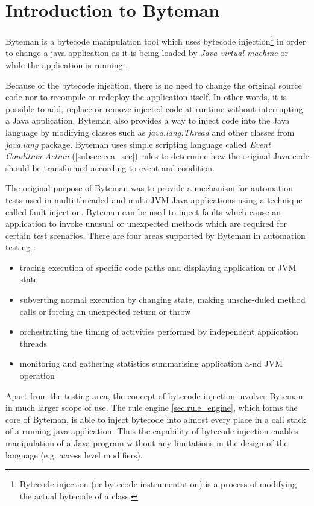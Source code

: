 \documentclass[12pt,oneside]{fithesis2}
\begin{document}
\section{Introduction to Byteman}
Byteman is a bytecode manipulation tool which uses bytecode injection\footnote{Bytecode injection (or bytecode instrumentation) is a process of modifying the actual bytecode of a class.} in order to change a java application as it is being loaded by \textit{Java virtual machine} or while the application is running \cite[Introduction to Byteman]{byteman_doc}.

Because of the bytecode injection, there is no need to change the original source code nor to recompile or redeploy the application itself. In other words, it is possible to add, replace or remove injected code at runtime without interrupting a Java application. Byteman also provides a way to inject code into the Java language by modifying classes such as \textit{java.lang.Thread} and other classes from \textit{java.lang} package. Byteman uses simple scripting language called \textit{Event Condition Action} (\ref{subsec:eca_sec}) rules to determine how the original Java code should be transformed according to event and condition.

The original purpose of Byteman was to provide a mechanism for automation tests used in multi-threaded and multi-JVM Java applications using a technique called fault injection. Byteman can be used to inject faults which cause an application to invoke unusual or unexpected methods which are required for certain test scenarios. There are four areas supported by Byteman in automation testing \cite[Introduction to Byteman]{byteman_doc}:

\begin{itemize}
   \item tracing execution of specific code paths and displaying application or JVM state
   \item subverting normal execution by changing state, making unsche-duled method calls or forcing an unexpected return or throw
   \item orchestrating the timing of activities performed by independent application threads
   \item monitoring and gathering statistics summarising application a-nd JVM operation
\end{itemize}
Apart from the testing area, the concept of bytecode injection involves Byteman in much larger scope of use. The rule engine \ref{sec:rule_engine}, which forms the core of Byteman, is able to inject bytecode into almost every place in a call stack of a running java application. Thus the capability of bytecode injection enables manipulation of a Java program without any limitations in the design of the language (e.g. access level modifiers).
\end{document}
